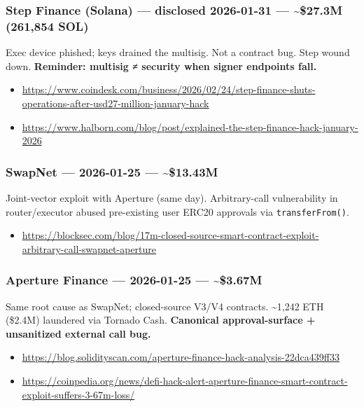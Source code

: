 \subsubsection{Step Finance (Solana) --- disclosed 2026-01-31 --- \textasciitilde\$27.3M (261,854 SOL)}\label{step-finance-solana-disclosed-2026-01-31-27.3m-261854-sol}

Exec device phished; keys drained the multisig. Not a contract bug. Step wound down. \textbf{Reminder: multisig ≠ security when signer endpoints fall.}

\begin{itemize}
\tightlist
\item
  \url{https://www.coindesk.com/business/2026/02/24/step-finance-shuts-operations-after-usd27-million-january-hack}
\item
  \url{https://www.halborn.com/blog/post/explained-the-step-finance-hack-january-2026}
\end{itemize}

\subsubsection{SwapNet --- 2026-01-25 --- \textasciitilde\$13.43M}\label{swapnet-2026-01-25-13.43m}

Joint-vector exploit with Aperture (same day). Arbitrary-call vulnerability in router/executor abused pre-existing user ERC20 approvals via \texttt{transferFrom()}.

\begin{itemize}
\tightlist
\item
  \url{https://blocksec.com/blog/17m-closed-source-smart-contract-exploit-arbitrary-call-swapnet-aperture}
\end{itemize}

\subsubsection{Aperture Finance --- 2026-01-25 --- \textasciitilde\$3.67M}\label{aperture-finance-2026-01-25-3.67m}

Same root cause as SwapNet; closed-source V3/V4 contracts. \textasciitilde1,242 ETH (\$2.4M) laundered via Tornado Cash. \textbf{Canonical approval-surface + unsanitized external call bug.}

\begin{itemize}
\tightlist
\item
  \url{https://blog.solidityscan.com/aperture-finance-hack-analysis-22dca439ff33}
\item
  \url{https://coinpedia.org/news/defi-hack-alert-aperture-finance-smart-contract-exploit-suffers-3-67m-loss/}
\end{itemize}

